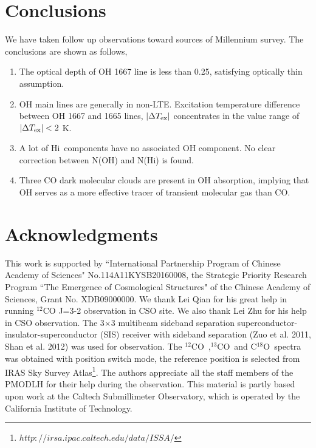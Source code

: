 \documentclass[preprint]{emulateapj}
\def\hi{H{\sc i}}
\def\co{$^{12}$CO}
\def\13co{$^{13}$CO}
\def\c18o{C$^{18}$O}
\begin{document}
\section{Conclusions}
\label{sec:conclusion}

We have taken follow up observations toward sources of Millennium survey. The conclusions are shown as follows, 

\begin{enumerate}
\item  The optical depth of OH 1667 line is less than 0.25, satisfying optically thin assumption.

\item  OH main lines are generally in non-LTE. Excitation temperature difference between OH  1667 and 1665 lines, $|\Delta T\rm_{ex}|$ concentrates in the value range of $|\Delta T\rm_{ex}| < 2$ K.

\item  A lot of \hi\ components have no associated OH component. No clear correction between N(OH) and N(\hi) is found.

\item  Three CO dark molecular clouds are present in OH absorption, implying that OH serves as a more effective tracer of transient molecular gas than CO. 

\end{enumerate}

\section*{Acknowledgments}

This work is supported by  ``International Partnership Program of Chinese Academy of Sciences"  No.114A11KYSB20160008,  the Strategic Priority Research Program ``The Emergence of  Cosmological Structures" of the Chinese Academy of Sciences, Grant No.  XDB09000000.
We thank Lei Qian for his great help in running $^{12}$CO J=3-2 observation in CSO site. 
We also thank Lei Zhu for his help in CSO observation. 
The 3$\times$3 multibeam sideband separation superconductor-insulator-superconductor (SIS) receiver with sideband separation (Zuo et al. 2011, Shan et al. 2012) was used for observation. The \co\ ,\13co\  and \c18o\  spectra was obtained with position switch mode, the reference position is selected from IRAS Sky Survey Atlas\footnote{$http://irsa.ipac.caltech.edu/data/ISSA/$}. 
The authors appreciate all the staff members of the PMODLH for their help during the observation. 
This material is partly based upon work at the Caltech Submillimeter Observatory, which is operated by the California Institute of Technology. 
\end{document}
